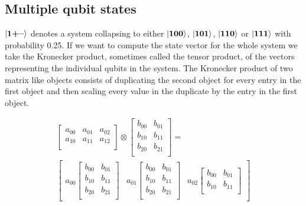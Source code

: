 \subsection{Multiple qubit states}
$\ket{\mathbf{1}\textbf{+}\textbf{--}}$ denotes a system collapsing to either $\ket{\mathbf{1}\mathbf{0}\mathbf{0}}$, $\ket{\mathbf{1}\mathbf{0}\mathbf{1}}$, $\ket{\mathbf{1}\mathbf{1}\mathbf{0}}$ or $\ket{\mathbf{1}\mathbf{1}\mathbf{1}}$ with probability 0.25. 
If we want to compute the state vector for the whole system we take the Kronecker product, sometimes called the tensor product, of the vectors representing the individual qubits in the system. 
The Kronecker product of two matrix like objects consists of duplicating the second object for every entry in the first object and then scaling every value in the duplicate by the entry in the first object.
\begin{figure}[H]
    \centering
    \begin{gather*}
        \begin{bmatrix}
            a_{00} & a_{01} & a_{02} \\
            a_{10} & a_{11} & a_{12} \\
        \end{bmatrix}
        \otimes
        \begin{bmatrix}
            b_{00} & b_{01} \\
            b_{10} & b_{11} \\
            b_{20} & b_{21} \\
        \end{bmatrix}
        = \\
        \begin{bmatrix}
            a_{00}
            \begin{bmatrix}
                b_{00} & b_{01} \\
                b_{10} & b_{11} \\
                b_{20} & b_{21} \\
            \end{bmatrix} 
            & a_{01}
            \begin{bmatrix}
                b_{00} & b_{01} \\
                b_{10} & b_{11} \\
                b_{20} & b_{21} \\
            \end{bmatrix} 
            & a_{02}
            \begin{bmatrix}
                b_{00} & b_{01} \\
                b_{10} & b_{11} \\

\end{bmatrix}
\end{bmatrix}
\end{gather*}
\end{figure}
